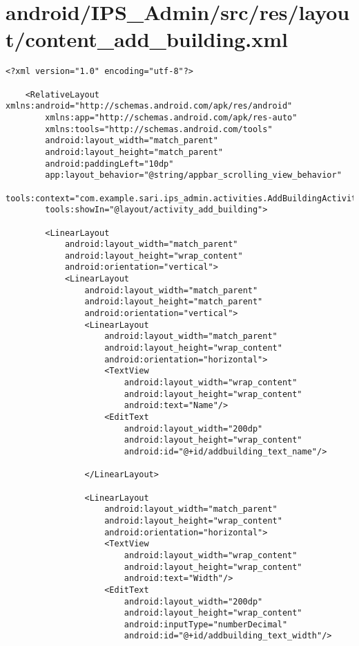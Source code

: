 \section{android/IPS\_Admin/src/res/layout/content\_add\_building.xml}
\begin{lstlisting}<?xml version="1.0" encoding="utf-8"?>

    <RelativeLayout xmlns:android="http://schemas.android.com/apk/res/android"
        xmlns:app="http://schemas.android.com/apk/res-auto"
        xmlns:tools="http://schemas.android.com/tools"
        android:layout_width="match_parent"
        android:layout_height="match_parent"
        android:paddingLeft="10dp"
        app:layout_behavior="@string/appbar_scrolling_view_behavior"
        tools:context="com.example.sari.ips_admin.activities.AddBuildingActivity"
        tools:showIn="@layout/activity_add_building">

        <LinearLayout
            android:layout_width="match_parent"
            android:layout_height="wrap_content"
            android:orientation="vertical">
            <LinearLayout
                android:layout_width="match_parent"
                android:layout_height="match_parent"
                android:orientation="vertical">
                <LinearLayout
                    android:layout_width="match_parent"
                    android:layout_height="wrap_content"
                    android:orientation="horizontal">
                    <TextView
                        android:layout_width="wrap_content"
                        android:layout_height="wrap_content"
                        android:text="Name"/>
                    <EditText
                        android:layout_width="200dp"
                        android:layout_height="wrap_content"
                        android:id="@+id/addbuilding_text_name"/>

                </LinearLayout>

                <LinearLayout
                    android:layout_width="match_parent"
                    android:layout_height="wrap_content"
                    android:orientation="horizontal">
                    <TextView
                        android:layout_width="wrap_content"
                        android:layout_height="wrap_content"
                        android:text="Width"/>
                    <EditText
                        android:layout_width="200dp"
                        android:layout_height="wrap_content"
                        android:inputType="numberDecimal"
                        android:id="@+id/addbuilding_text_width"/>


\end{lstlisting}

